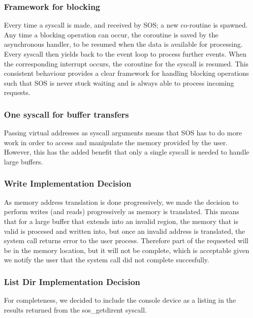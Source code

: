 \documentclass[runningheads,a4paper]{llncs}
\begin{document}
\subsubsection{Framework for blocking}

Every time a syscall is made, and received by SOS; a new co-routine is spawned. Any time a blocking operation can occur, the coroutine is saved by the asynchronous handler, to be resumed when the data is available for processing. Every syscall then yields back to the event loop to process further events. When the corresponding interrupt occurs, the coroutine for the syscall is resumed. This consistent behaviour provides a clear framework for handling blocking operations such that SOS is never stuck waiting and is always able to process incoming requests.

\subsubsection{One syscall for buffer transfers}

Passing virtual addresses as syscall arguments means that SOS has to do more work in order to access and manipulate the memory provided by the user. However, this has the added benefit that only a single syscall is needed to handle large buffers. 

\subsubsection{Write Implementation Decision}

As memory address translation is done progressively, we made the decision to perform writes (and reads) progressively as memory is translated. This means that for a large buffer that extends into an invalid region, the memory that is valid is procesed and written into, but once an invalid address is translated, the system call returns error to the user process. Therefore part of the requested will be in the memory location, but it will not be complete, which is acceptable given we notify the user that the system call did not complete succesfully. 

\subsubsection{List Dir Implementation Decision}

For completeness, we decided to include the console device as a listing in the results returned from the sos\_getdirent syscall.
\end{document}
